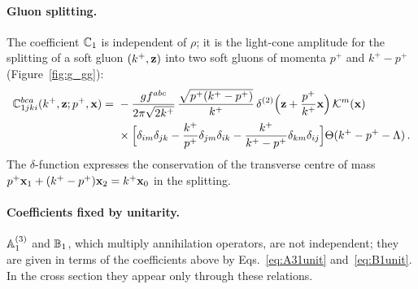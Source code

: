 \paragraph{Gluon splitting.} The coefficient $\mathbb{C}_1$ is independent of $\rho$; it is the light-cone amplitude for the splitting of a soft gluon $(k^+,\mathbf{z})$ into two soft gluons of momenta $p^+$ and $k^+-p^+$ (Figure~\ref{fig:g_gg}):
\begin{align}\label{eq:C1}
\mf C^{bca}_{1jki}(k^+,\v z;p^+,\v x)=\ &-\frac{gf^{abc}}{2\pi\sqrt{2k^+}}\,\frac{\sqrt{p^+(k^+-p^+)}}{k^+}\,\delta^{(2)}\Big(\v z+\frac{p^+}{k^+}\v x\Big)\,\Kv^m(\v x)
\notag\\&\times\Big[\delta_{im}\delta_{jk}-\frac{k^+}{p^+}\delta_{jm}\delta_{ik}-\frac{k^+}{k^+-p^+}\delta_{km}\delta_{ij}\Big]\Theta(k^+-p^+-\Lambda)\,.
\end{align}
The $\delta$-function expresses the conservation of the transverse centre of mass $p^+\mathbf{x}_1+(k^+-p^+)\mathbf{x}_2=k^+\mathbf{x}_0$ in the splitting.

\paragraph{Coefficients fixed by unitarity.} $\mathbb{A}^{(3)}_1$ and $\mathbb{B}_1$, which multiply annihilation operators, are not independent; they are given in terms of the coefficients above by Eqs.~\eqref{eq:A31unit} and~\eqref{eq:B1unit}. In the cross section they appear only through these relations.
